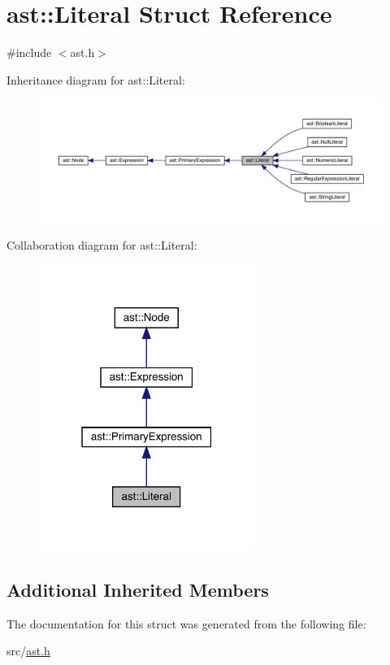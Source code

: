 \hypertarget{structast_1_1_literal}{}\section{ast\+:\+:Literal Struct Reference}
\label{structast_1_1_literal}


{\ttfamily \#include $<$ast.\+h$>$}



Inheritance diagram for ast\+:\+:Literal\+:\nopagebreak
\begin{figure}[H]
\begin{center}
\leavevmode
\includegraphics[width=350pt]{structast_1_1_literal__inherit__graph}
\end{center}
\end{figure}


Collaboration diagram for ast\+:\+:Literal\+:\nopagebreak
\begin{figure}[H]
\begin{center}
\leavevmode
\includegraphics[width=199pt]{structast_1_1_literal__coll__graph}
\end{center}
\end{figure}
\subsection*{Additional Inherited Members}


The documentation for this struct was generated from the following file\+:\begin{DoxyCompactItemize}
\item 
src/\hyperlink{ast_8h}{ast.\+h}\end{DoxyCompactItemize}
